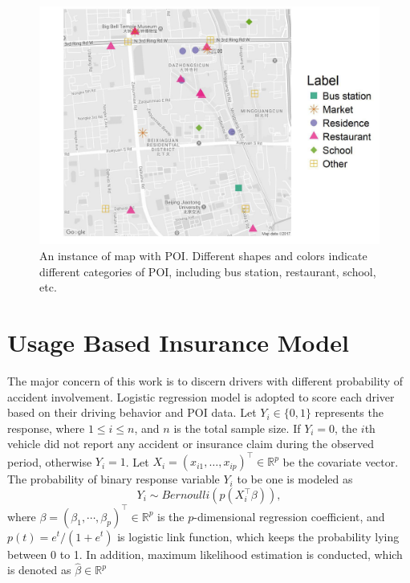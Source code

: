 \documentclass[sii]{ipart}
\theoremstyle{plain}
\begin{document}
\begin{figure}[h!]
	\centering
	\includegraphics[width=1.\linewidth]{poimap}
	\small\caption[]{An instance of map with POI. Different shapes and colors indicate different categories of POI, including bus station, restaurant, school, etc.}
	\label{fig:poimap}
\end{figure}





\section{Usage Based Insurance Model}

The major concern of this work is to discern drivers with different probability of accident involvement. Logistic regression model is adopted to score each driver based on their driving behavior and POI data. Let $Y_i \in \{0,1\}$ represents the response, where $1 \leq i \leq n$, and $n$ is the total sample size. If $Y_i = 0$, the $i$th vehicle did not report any accident or insurance claim during the observed period, otherwise $Y_i = 1$. Let $X_i = (x_{i1}, \dots ,x_{ip})^\top \in \mathbb{R}^p$ be the covariate vector. The probability of binary response variable $Y_i$ to be one is modeled as
\begin{equation} 
Y_i \sim Bernoulli(p(X^\top_i\beta)),\label{eq:model}
\end{equation} 
where $\beta=(\beta_1,\cdots,\beta_p)^\top\in \mathbb{R}^p$ is the $p$-dimensional regression coefficient, and $p(t)=e^t/(1+e^t)$ is logistic link function, which keeps the probability lying between 0 to 1. In addition, maximum likelihood estimation is conducted, which is denoted as $\hat{\beta} \in \mathbb{R}^p$
\end{document}
